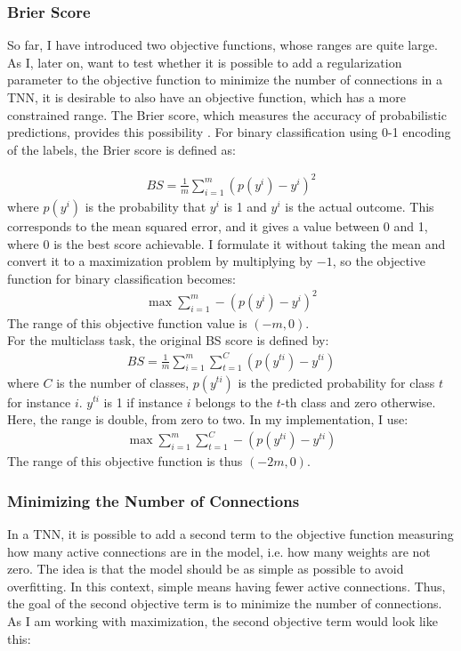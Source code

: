 \subsubsection{Brier Score}
So far, I have introduced two objective functions, whose ranges are quite large. As I, later on, want to test whether it is possible to add a regularization parameter to the objective function to minimize the number of connections in a TNN, it is desirable to also have an objective function, which has a more constrained range. The Brier score, which measures the accuracy of probabilistic predictions, provides this possibility \citep{brier}. For binary classification using 0-1 encoding of the labels, the Brier score is defined as: 

\begin{align}
    BS = \frac{1}{m} \sum_{i = 1} ^m (p(y^i) - y^i) ^2 
\end{align}
where $p(y^i)$ is the probability that $y^i$ is 1 and $y^i$ is the actual outcome. This corresponds to the mean squared error, and it gives a value between 0 and 1, where 0 is the best score achievable. I formulate it without taking the mean and convert it to a maximization problem by multiplying by $-1$, so the objective function for binary classification becomes:
\begin{align}
    \label{BS_binary} \max \sum_{i=1}^m - (p(y^i) - y^i) ^2 
\end{align}
The range of this objective function value is $(-m, 0)$. \\
\noindent For the multiclass task, the original BS score is defined by: 
\begin{align}
    BS = \frac{1} {m} \sum_{i=1} ^m \sum_{t=1} ^C (p(y^{ti}) - y^{ti})
\end{align}
where $C$ is the number of classes, $p(y^{ti})$ is the predicted probability for class $t$ for instance $i$. $y^{ti}$ is 1 if instance $i$ belongs to the $t$-th class and zero otherwise. Here, the range is double, from zero to two. In my implementation, I use:
\begin{align}
    \label{BS} \max \sum_{i=1}^m \sum_{t=1} ^C - (p(y^{ti}) - y^{ti})
\end{align}
The range of this objective function is thus $(-2m, 0)$. 

\subsubsection{Minimizing the Number of Connections}
In a TNN, it is possible to add a second term to the objective function measuring how many active connections are in the model, i.e. how many weights are not zero. The idea is that the model should be as simple as possible to avoid overfitting. In this context, simple means having fewer active connections. Thus, the goal of the second objective term is to minimize the number of connections. As I am working with maximization, the second objective term would look like this:

